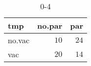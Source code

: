 %
\begin{table}[!tbp]
\caption{0-4\label{0-4}} 
\begin{center}
\begin{tabular}{lrr}
\hline\hline
\multicolumn{1}{l}{tmp}&\multicolumn{1}{c}{no.par}&\multicolumn{1}{c}{par}\tabularnewline
\hline
no.vac&$10$&$24$\tabularnewline
vac&$20$&$14$\tabularnewline
\hline
\end{tabular}
\end{center}
\end{table}

